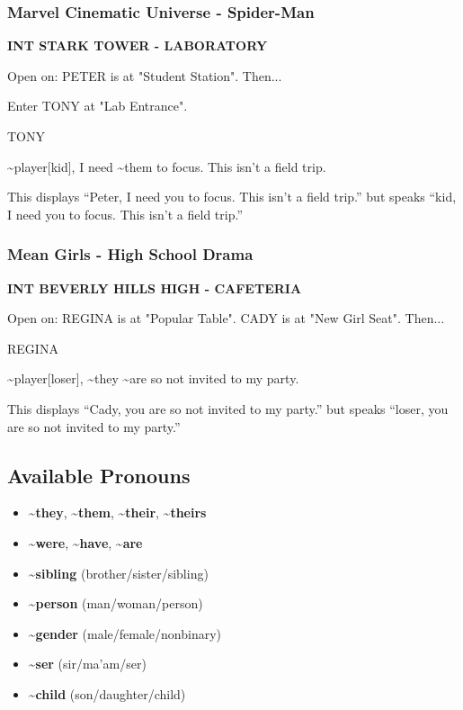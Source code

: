 \documentclass[11pt,letterpaper,oldstylefigures]{memoir}
\newcommand{\slugline}[1]{\nobreak\textbf{\MakeUppercase{#1}}\par\nobreak\vspace{1\baselineskip}}
\newcommand{\speaker}[1]{\nobreak\hspace*{0.333\textwidth}\MakeUppercase{#1}\par\nobreak\vspace{0.5\baselineskip}}
\newcommand{\dialogue}[1]{\nobreak\hspace*{0.25\textwidth}\begin{minipage}{0.5\textwidth}#1\end{minipage}\par\vspace{1\baselineskip}}
\newcommand{\stagedir}[1]{#1\par\vspace{1\baselineskip}}
\newenvironment{FountainExample}
  {\begingroup
  \ttfamily\small
   \setlength{\parindent}{0pt}
  \setlength{\parskip}{0.5em}
  \allowdisplaybreaks
  \setlength{\displaywidowpenalty}{0}
  \setlength{\widowpenalty}{0}
  \setlength{\clubpenalty}{0}
  \setlength{\interlinepenalty}{0}
}
  {\endgroup}
\newcommand{\paragraphbreak}{\vspace{0.5em}}
\newcommand{\fountain}[1]{\textbf{#1}}
\begin{document}
\paragraphbreak

\subsubsection*{Marvel Cinematic Universe - Spider-Man}
\label{ex:marvel-cinematic-universe-spider-man}

\begin{FountainExample}
\slugline{INT STARK TOWER - LABORATORY}

\stagedir{Open on: PETER is at "Student Station". Then...}
\stagedir{Enter TONY at "Lab Entrance".}

\speaker{TONY}
\dialogue{\textasciitilde{}player[kid], I need \textasciitilde{}them to focus. This isn't a field trip.}
\end{FountainExample}

This displays ``Peter, I need you to focus. This isn't a field trip.'' but speaks ``kid, I need you to focus. This isn't a field trip.''

\subsubsection*{Mean Girls - High School Drama}
\label{ex:mean-girls-high-school-drama-2}

\begin{FountainExample}
\slugline{INT BEVERLY HILLS HIGH - CAFETERIA}

\stagedir{Open on: REGINA is at "Popular Table". CADY is at "New Girl Seat". Then...}

\speaker{REGINA}
\dialogue{\textasciitilde{}player[loser], \textasciitilde{}they \textasciitilde{}are so not invited to my party.}
\end{FountainExample}

This displays ``Cady, you are so not invited to my party.'' but speaks ``loser, you are so not invited to my party.''

\subsection{Available Pronouns}

\begin{itemize}
\item \fountain{\textasciitilde{}they}, \fountain{\textasciitilde{}them}, \fountain{\textasciitilde{}their}, \fountain{\textasciitilde{}theirs}
\item \fountain{\textasciitilde{}were}, \fountain{\textasciitilde{}have}, \fountain{\textasciitilde{}are}
\item \fountain{\textasciitilde{}sibling} (brother/sister/sibling)
\item \fountain{\textasciitilde{}person} (man/woman/person)
\item \fountain{\textasciitilde{}gender} (male/female/nonbinary)
\item \fountain{\textasciitilde{}ser} (sir/ma'am/ser)
\item \fountain{\textasciitilde{}child} (son/daughter/child)
\end{itemize}
\end{document}
